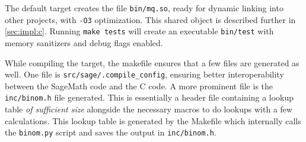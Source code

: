 The default target creates the file \texttt{bin/mq.so}, ready for dynamic linking into other projects, with \texttt{-O3} optimization. This shared object is described further in \cref{sec:impl:c}. Running \texttt{make tests} will create an executable \texttt{bin/test} with memory sanitizers and debug flags enabled. 

While compiling the target, the makefile ensures that a few files are generated as well. One file is \texttt{src/sage/.compile\_config}, ensuring better interoperability between the SageMath code and the C code. A more prominent file is the \texttt{inc/binom.h} file generated. This is essentially a header file containing a lookup table \textit{of sufficient size} alongside the necessary macros to do lookups with a few calculations. This lookup table is generated by the Makefile which internally calls the \texttt{binom.py} script and saves the output in \texttt{inc/binom.h}.

\newpage